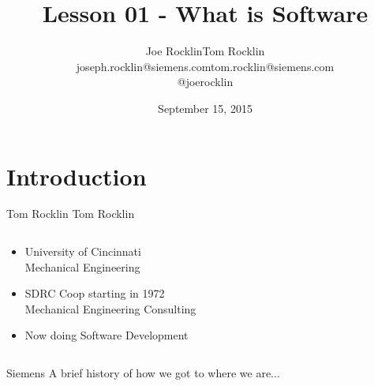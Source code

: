 \documentclass[serif,mathserif,compress]{beamer}
\begin{document}
\author[Joe Rocklin]{
\begin{tabular}[t]{c c}
  Joe Rocklin & Tom Rocklin \\
  joseph.rocklin@siemens.com &  tom.rocklin@siemens.com \\
  @joerocklin &
\end{tabular}
}

\title[Lesson 01\hspace{2em}\insertframenumber/\inserttotalframenumber]{Lesson 01 - What is Software}

\date{September 15, 2015} %


\maketitle

\section{Introduction}  %
\begin{frame}{Tom Rocklin}
  Tom Rocklin
  \begin{columns}[T]
  \begin{column}[T]{.5\textwidth}
    \begin{itemize}
    \item University of Cincinnati\\Mechanical Engineering
    \item SDRC Coop starting in 1972\\Mechanical Engineering Consulting
    \item Now doing Software Development
    \end{itemize}
  \end{column}
  \end{columns}
\end{frame}

\begin{frame}{Siemens}
  A brief history of how we got to where we are...
\end{frame}
\end{document}
